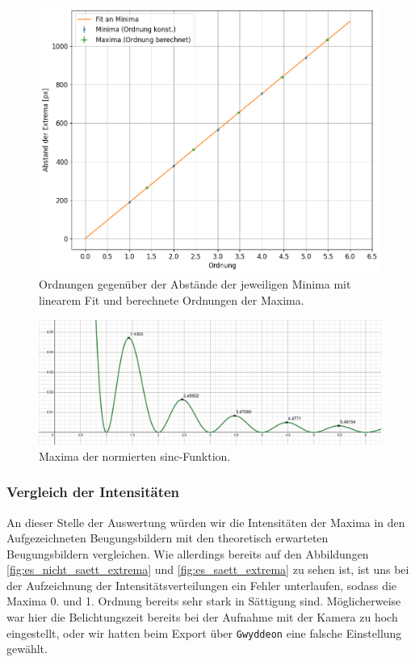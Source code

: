 \begin{figure}[H]
  \centering
  \includegraphics[width=.9\textwidth]{files/plots/2/es_fit_ordnung.png}
  \caption{Ordnungen gegenüber der Abstände der jeweiligen Minima mit linearem Fit und berechnete Ordnungen der Maxima.}
  \label{fig:es_fit_ordnung}
\end{figure}

\begin{figure}[H]
  \centering
  \includegraphics[width=\textwidth]{files/plots/2/maxima_normed_sinc.png}
  \caption{Maxima der normierten sinc-Funktion.}
  \label{fig:maxima_normed_sinc}
\end{figure}

\subsubsection*{Vergleich der Intensitäten}

An dieser Stelle der Auswertung würden wir die Intensitäten der Maxima in den Aufgezeichneten Beugungsbildern mit den theoretisch erwarteten Beugungsbildern vergleichen. Wie allerdings bereits auf den Abbildungen \ref{fig:es_nicht_saett_extrema} und \ref{fig:es_saett_extrema} zu sehen ist, ist uns bei der Aufzeichnung der Intensitätsverteilungen ein Fehler unterlaufen, sodass die Maxima 0. und 1. Ordnung bereits sehr stark in Sättigung sind. Möglicherweise war hier die Belichtungszeit bereits bei der Aufnahme mit der Kamera zu hoch eingestellt, oder wir hatten beim Export über \texttt{Gwyddeon} eine falsche Einstellung gewählt. 

